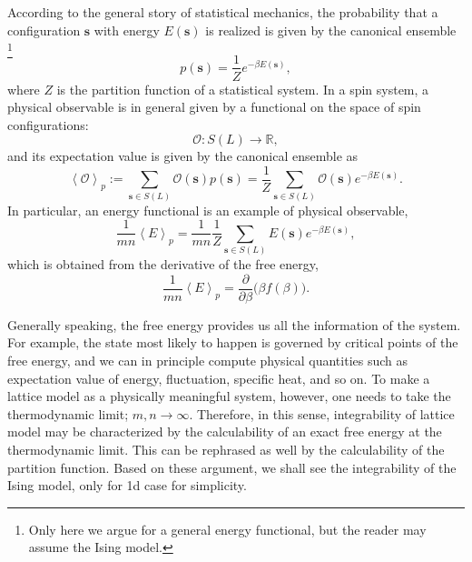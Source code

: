 According to the general story of statistical mechanics, the probability
that a configuration $\mathbf{s}$ with energy $E(\mathbf{s})$
is realized is given by the canonical ensemble%
%
\footnote{Only here we argue for a general energy functional,
but the reader may assume the Ising model. }
%
\begin{equation}
p(\mathbf{s})  =  \frac{1}{Z}e^{-\beta E\left(\mathbf{s}\right)},
\end{equation}
where $Z$ is the partition function of a statistical system. In a spin
system, a physical observable is in general given by a functional on
the space of spin configurations:
\begin{equation}
  \mathcal{O}  :  S(L)  \longrightarrow  \mathbb{R},
\end{equation}
and its expectation value is given by the canonical ensemble as
\begin{equation}
\left\langle \mathcal{O}\right\rangle _{p}
  :=\sum_{\mathbf{s}\in S(L)}\mathcal{O}(\mathbf{s})p(\mathbf{s})
    =\frac{1}{Z}\sum_{\mathbf{s}\in S(L)}\mathcal{O}(\mathbf{s})e^{-\beta E(\mathbf{s})}.
\end{equation}
In particular, an energy functional is an example of physical observable,
\begin{equation}
\frac{1}{mn}\left\langle E\right\rangle _{p}
  =\frac{1}{mn}\frac{1}{Z}\sum_{\mathbf{s}\in S(L)}E(\mathbf{s})e^{-\beta E(\mathbf{s})},
\end{equation}
which is obtained from the derivative of the free energy,
\begin{equation}
  \frac{1}{mn}\left\langle E\right\rangle _{p}
    = \frac{\partial}{\partial\beta}\big(\beta f(\beta)\big).
\end{equation}

Generally speaking, the free energy provides us all the information
of the system. For example, the state most likely to happen is governed
by critical points of the free energy, and we can in principle
compute physical quantities such as expectation value of energy, fluctuation,
specific heat, and so on. To make a lattice model as a physically
meaningful system, however, one needs to take the thermodynamic limit;
$m,n\to\infty$. Therefore, in this sense, integrability of
lattice model may be characterized by the calculability of an exact free
energy at the thermodynamic limit. This can be rephrased as well by the calculability
of the partition function. Based on these argument, we shall
see the integrability of the Ising model, only for 1d case for simplicity.





